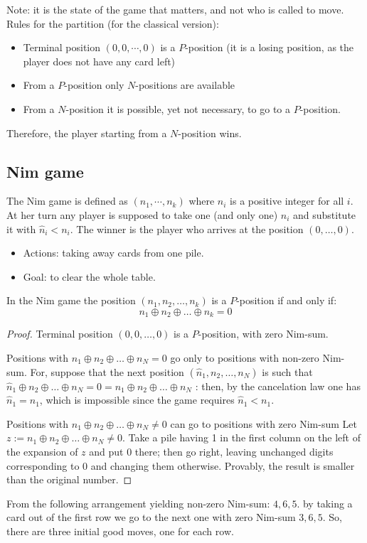 Note: it is the state of the game that matters, and not who is called to move.
Rules for the partition (for the classical version):
\begin{itemize}
    \item Terminal position $(0, 0, \cdots, 0)$ is a $P$-position (it is a losing position, as the player does not have any card left)
    \item From a $P$-position only $N$-positions are available
    \item From a $N$-position it is possible, yet not necessary, to go to a $P$-position. 
\end{itemize}
Therefore, the player starting from a $N$-position wins. 

\subsection{Nim game}
The Nim game is defined as $(n_1, \cdots, n_k)$ where $n_i$ is a positive integer for all $i$.
At her turn any player is supposed to take one (and only one) $n_i$ and substitute it with $\hat{n}_i < n_i$. 
The winner is the player who arrives at the position $(0, \dots, 0)$. 
\begin{itemize}
    \item Actions: taking away cards from one pile.
    \item Goal: to clear the whole table.
\end{itemize}

\begin{theorem}[Bouton]
    In the Nim game the position $(n_1, n_2, \dots, n_k)$ is a $P$-position if and only if:
    \[n_1 \oplus n_2 \oplus \dots \oplus n_k = 0\]
\end{theorem}
\begin{proof}
    Terminal position $(0, 0, \dots , 0)$ is a $P$-position, with zero Nim-sum.

    Positions with $n_1 \oplus n_2 \oplus \dots \oplus n_N = 0$ go only to positions with non-zero Nim-sum. 
    For, suppose that the next position $( \hat{n}_1, n_2, \dots , n_N )$ is such that $\hat{n}_1 \oplus n_2 \oplus \dots \oplus n_N = 0 = n_1 \oplus n_2 \oplus \dots \oplus n_N$ : then, by the cancelation law one has $\hat{n}_1 = n_1$, which is impossible since the game requires $\hat{n}_1 < n_1$.

    Positions with $n_1 \oplus n_2 \oplus \dots \oplus n_N \neq 0$ can go to positions with zero Nim-sum
    Let $z := n_1 \oplus n_2 \oplus \dots \oplus n_N\neq 0$. Take a pile having 1 in the first column on the left of the expansion of $z$ and put 0 there; then go right, leaving unchanged digits corresponding to 0 and changing them otherwise. 
    Provably, the result is smaller than the original number.
\end{proof}
\begin{example}
    From the following arrangement yielding non-zero Nim-sum: $4, 6,5$. 
    by taking a card out of the first row we go to the next one with zero Nim-sum  $3, 6,5$. 
    So, there are three initial good moves, one for each row.
\end{example}


